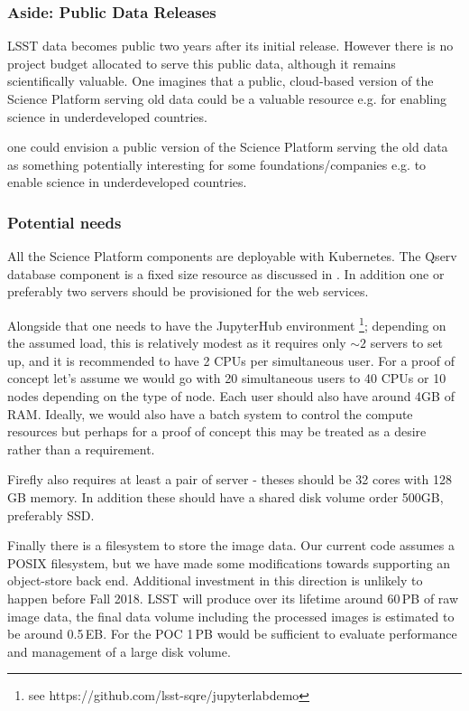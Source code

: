 \subsubsection{Aside: Public Data Releases}

LSST data becomes public two years after its initial release.
However there is no project budget allocated to serve this public data, although it remains scientifically valuable.
One imagines that a public, cloud-based version of the Science Platform serving old data could be a valuable resource e.g. for enabling science in underdeveloped countries.

one could envision a public version of the Science Platform serving the old data as something potentially interesting for some foundations/companies e.g. to enable science in underdeveloped countries.

\subsubsection{Potential needs}

All the Science Platform components are deployable with Kubernetes.
The Qserv database component is a fixed size resource as discussed in .
In addition one or preferably two servers should be provisioned for the web services.

Alongside that one needs to have the JupyterHub environment \footnote{see https://github.com/lsst-sqre/jupyterlabdemo}; depending on the assumed load, this is relatively modest as it requires only $\sim2$ servers to set up, and it is recommended to have 2 CPUs per simultaneous user.
For a proof of concept let's assume we would go with 20 simultaneous users to 40 CPUs or 10 nodes depending on the type of node.
Each user should also have around 4GB of RAM.
Ideally, we would also have a batch system to control the compute resources but perhaps for a proof of concept this may be treated as a desire rather than a requirement.

Firefly also requires at least a pair of  server - theses should be 32 cores
with 128 GB memory. In addition these should have a shared disk volume order 500GB, preferably SSD.

Finally there is a filesystem to store the image data.
Our current code assumes a POSIX filesystem, but we have made some modifications towards supporting an object-store back end.
Additional investment in this direction is unlikely to happen before Fall 2018.
LSST will produce over its lifetime around 60\,PB of raw image data, the final data volume including the processed images is estimated to be around 0.5\,EB.
For the POC 1\,PB would be sufficient to evaluate performance and management of a large disk volume.

